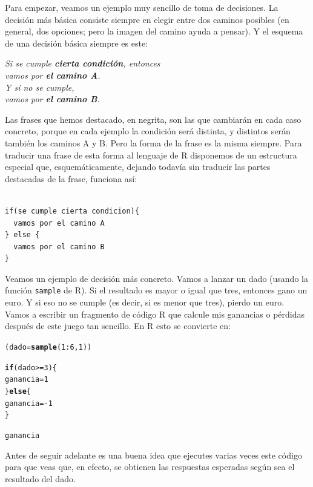 \documentclass[10pt,a4paper]{article}\usepackage[]{graphicx}\usepackage[]{color}
\makeatletter
\newcommand{\hlnum}[1]{\textcolor[rgb]{0.686,0.059,0.569}{#1}}%
\newcommand{\hlopt}[1]{\textcolor[rgb]{0,0,0}{#1}}%
\newcommand{\hlstd}[1]{\textcolor[rgb]{0.345,0.345,0.345}{#1}}%
\newcommand{\hlkwa}[1]{\textcolor[rgb]{0.161,0.373,0.58}{\textbf{#1}}}%
\newcommand{\hlkwb}[1]{\textcolor[rgb]{0.69,0.353,0.396}{#1}}%
\newcommand{\hlkwd}[1]{\textcolor[rgb]{0.737,0.353,0.396}{\textbf{#1}}}%
\newenvironment{kframe}{%
 \def\at@end@of@kframe{}%
 \ifinner\ifhmode%
  \def\at@end@of@kframe{\end{minipage}}%
  \begin{minipage}{\columnwidth}%
 \fi\fi%
 \def\FrameCommand##1{\hskip\@totalleftmargin \hskip-\fboxsep
 \colorbox{shadecolor}{##1}\hskip-\fboxsep
     \hskip-\linewidth \hskip-\@totalleftmargin \hskip\columnwidth}%
 \MakeFramed {\advance\hsize-\width
   \@totalleftmargin\z@ \linewidth\hsize
   \@setminipage}}%
 {\par\unskip\endMakeFramed%
 \at@end@of@kframe}
\newenvironment{knitrout}{}{} %
\makeatother
\begin{document}
Para empezar, veamos un ejemplo muy sencillo de toma de decisiones. La decisión más básica consiste siempre en elegir entre dos caminos posibles (en general, dos opciones; pero la imagen del camino ayuda a pensar).  Y el esquema de una decisión básica siempre es este:
\begin{center}
\begin{minipage}{12cm}
    {\em Si se cumple {\bf cierta condición}, entonces\\
    \phantom{palabra} vamos por {\bf el camino A}.\\
    Y si no se cumple, \\
    \phantom{palabra} vamos por {\bf el camino B}.}
\end{minipage}
\end{center}
Las frases que hemos destacado, en negrita, son las que cambiarán en cada caso concreto, porque en cada ejemplo la condición será distinta, y distintos serán también los caminos A y B. Pero la forma de la frase es la misma siempre. Para traducir una frase de esta forma al lenguaje de R disponemos de un estructura especial que, esquemáticamente, dejando todavía sin traducir las partes destacadas de la frase, funciona así:
\begin{knitrout}
\color{fgcolor}\begin{kframe}
\begin{verbatim}

if(se cumple cierta condicion){
  vamos por el camino A
} else {
  vamos por el camino B
}
\end{verbatim}
\end{kframe}
\end{knitrout}
Veamos un ejemplo de decisión más concreto. Vamos a lanzar un dado (usando la función {\tt sample} de R).  Si el resultado es mayor o igual que  tres, entonces gano un euro. Y si eso no se cumple (es decir, si es menor que tres),  pierdo un euro. Vamos a escribir un fragmento de código R que calcule mis ganancias o pérdidas después de este juego tan sencillo. En R esto se convierte en:
\begin{knitrout}
\color{fgcolor}\begin{kframe}
\begin{alltt}
    \hlstd{(dado}\hlkwb{=}\hlkwd{sample}\hlstd{(}\hlnum{1}\hlopt{:}\hlnum{6}\hlstd{,}\hlnum{1}\hlstd{))}

    \hlkwa{if}\hlstd{(dado} \hlopt{>=} \hlnum{3}\hlstd{)\{}
        \hlstd{ganancia} \hlkwb{=} \hlnum{1}
    \hlstd{\}} \hlkwa{else} \hlstd{\{}
        \hlstd{ganancia} \hlkwb{=} \hlopt{-}\hlnum{1}
    \hlstd{\}}

    \hlstd{ganancia}
\end{alltt}
\end{kframe}
\end{knitrout}
Antes de seguir adelante es una buena idea que ejecutes varias veces este código para que veas que, en efecto, se obtienen las respuestas esperadas según sea el resultado del dado.
\end{document}

